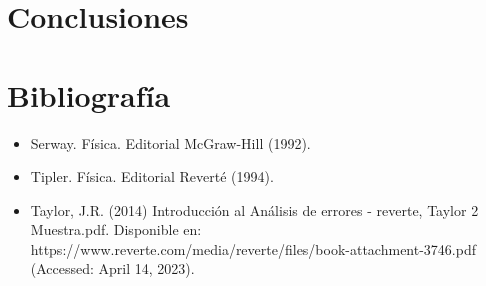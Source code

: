\documentclass[10pt]{article}
\begin{document}
\section{Conclusiones}


\section{Bibliografía}
\begin{itemize}
    \item  Serway. F\'isica. Editorial McGraw-Hill (1992).
    \item Tipler. Física. Editorial Revert\'e (1994).
    \item Taylor, J.R. (2014) Introducci\'on al Análisis de errores - reverte, Taylor 2 Muestra.pdf. Disponible en: https://www.reverte.com/media/reverte/files/book-attachment-3746.pdf (Accessed: April 14, 2023).

\end{itemize}
\end{document}
